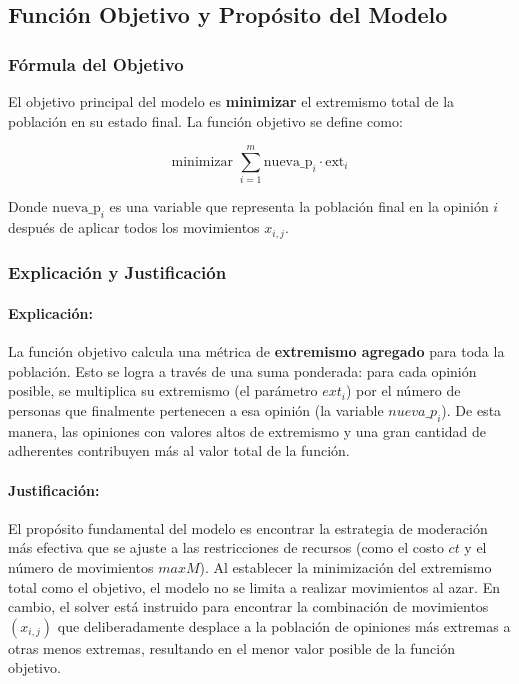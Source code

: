 \documentclass[11pt,letter]{article}
\begin{document}
\subsection{Función Objetivo y Propósito del Modelo}

\subsubsection{Fórmula del Objetivo}
El objetivo principal del modelo es \textbf{minimizar} el extremismo total de la población en su estado final. La función objetivo se define como:

$$
\text{minimizar } \sum_{i=1}^{m} \text{nueva\_p}_i \cdot \text{ext}_i
$$

Donde $\text{nueva\_p}_i$ es una variable que representa la población final en la opinión $i$ después de aplicar todos los movimientos $x_{i,j}$.

\subsubsection{Explicación y Justificación}

\paragraph{Explicación:}
La función objetivo calcula una métrica de \textbf{extremismo agregado} para toda la población. Esto se logra a través de una suma ponderada: para cada opinión posible, se multiplica su extremismo (el parámetro $ext_i$) por el número de personas que finalmente pertenecen a esa opinión (la variable $nueva\_p_i$). De esta manera, las opiniones con valores altos de extremismo y una gran cantidad de adherentes contribuyen más al valor total de la función.

\paragraph{Justificación:}
El propósito fundamental del modelo es encontrar la estrategia de moderación más efectiva que se ajuste a las restricciones de recursos (como el costo $ct$ y el número de movimientos $maxM$). Al establecer la minimización del extremismo total como el objetivo, el modelo no se limita a realizar movimientos al azar. En cambio, el solver está instruido para encontrar la combinación de movimientos $(x_{i,j})$ que deliberadamente desplace a la población de opiniones más extremas a otras menos extremas, resultando en el menor valor posible de la función objetivo.
\end{document}
